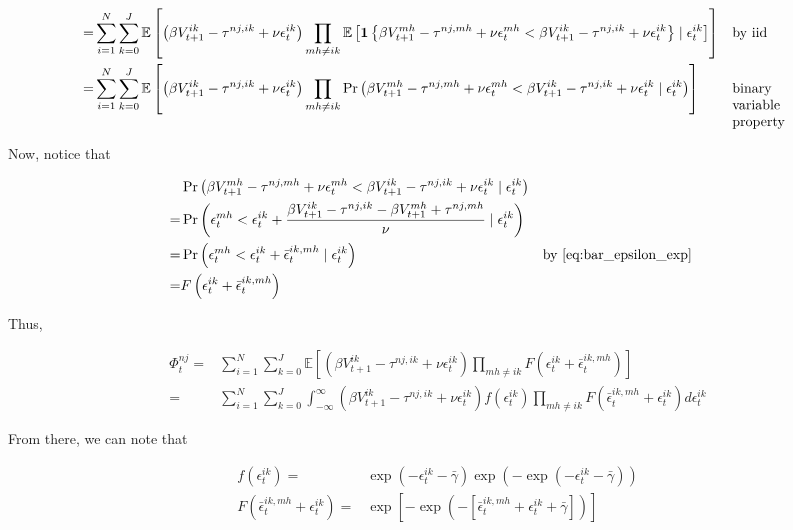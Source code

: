 \documentclass[10pt]{article}
\begin{document}
\begin{align}
    = &\sum_{i=1}^N \sum_{k=0}^J \mathbb{E}\left[ \left(\beta V_{t+1}^{i k}-\tau^{n j, i k}+\nu \epsilon_t^{i k}\right) \prod_{m h \neq i k} \mathbb{E} \left[ \mathbf{1}\left\{ \beta V_{t+1}^{m h}-\tau^{n j, m h}+\nu \epsilon_t^{m h} < \beta V_{t+1}^{i k}-\tau^{n j, i k}+\nu \epsilon_t^{i k} \right\} \mid \epsilon_t^{i k} \right] \right]  && \text{by iid}\\
    = &\sum_{i=1}^N \sum_{k=0}^J \mathbb{E}\left[ \left(\beta V_{t+1}^{i k}-\tau^{n j, i k}+\nu \epsilon_t^{i k}\right) \prod_{m h \neq i k} \Pr \left(\beta V_{t+1}^{m h}-\tau^{n j, m h}+\nu \epsilon_t^{m h} < \beta V_{t+1}^{i k}-\tau^{n j, i k}+\nu \epsilon_t^{i k} \mid \epsilon_t^{i k} \right) \right] && \parbox[t]{1.5cm}{\raggedright binary variable property}
\end{align}

Now, notice that 

\begin{align}
    &\Pr\left(\beta V_{t+1}^{m h}-\tau^{n j, m h}+\nu \epsilon_t^{m h}<\beta V_{t+1}^{i k}-\tau^{n j, i k}+\nu \epsilon_t^{i k} \mid \epsilon_t^{i k}\right) \\
    = &\Pr\left(\epsilon_t^{m h} < \epsilon_t^{i k}+\frac{\beta V_{t+1}^{i k}-\tau^{n j, i k}-\beta V_{t+1}^{m h}+\tau^{n j, m h}}{\nu} \mid \epsilon_t^{i k}\right) \\
    = &\Pr\left(\epsilon_t^{m h} < \epsilon_t^{i k}+\bar{\epsilon}_t^{i k, m h} \mid \epsilon_t^{i k}\right) && \text{by \eqref{eq:bar_epsilon_exp}} \\
    = &F\left(\epsilon_t^{i k}+\bar{\epsilon}_t^{i k, m h}\right) \\
\end{align}

Thus,

\begin{align}
    \Phi_t^{n j} = &\sum_{i=1}^N \sum_{k=0}^J \mathbb{E}\left[ \left(\beta V_{t+1}^{i k}-\tau^{n j, i k}+\nu \epsilon_t^{i k}\right) \prod_{m h \neq i k} F\left(\epsilon_t^{i k}+\bar{\epsilon}_t^{i k, m h}\right) \right] \\
     = &\sum_{i=1}^N \sum_{k=0}^J \int_{-\infty}^{\infty}\left(\beta V_{t+1}^{i k}-\tau^{n j, i k}+\nu \epsilon_t^{i k}\right) f\left(\epsilon_t^{i k}\right) \prod_{m h \neq i k} F\left(\bar{\epsilon}_t^{i k, m h}+\epsilon_t^{i k}\right) d \epsilon_t^{i k}
\end{align}

From there, we can note that

\begin{align}
    f\left(\epsilon_t^{i k}\right) = &\exp ( - \epsilon_t^{i k} - \bar{\gamma}) \exp \left( -\exp \left( - \epsilon_t^{i k} - \bar{\gamma} \right) \right) \\
    F\left(\bar{\epsilon}_t^{i k, m h}+\epsilon_t^{i k}\right)= &\exp \left[-\exp \left(-\left[\bar{\epsilon}_t^{i k, m h}+\epsilon_t^{i k}+\bar{\gamma}\right]\right)\right]
\end{align}
\end{document}
